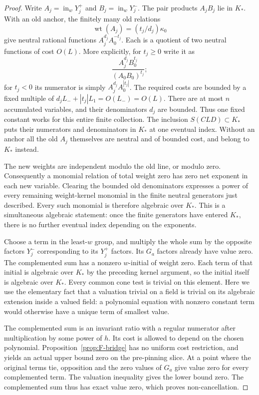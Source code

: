\begin{proof}
Write $A_j=\operatorname{in}_wY_j^+$ and
$B_j=\operatorname{in}_wY_j^-$.  The pair products $A_jB_j$ lie in $K_*$.
With an old anchor, the finitely many old relations
\[
 \operatorname{wt}(A_j)=(t_j/d_j)\kappa_0
\]
give neutral rational functions $A_j^{d_j}A_0^{-t_j}$.  Each is a quotient
of two neutral functions of cost $O(L)$.  More explicitly, for $t_j\ge0$
write it as
\[
 \frac{A_j^{d_j}B_0^{t_j}}{(A_0B_0)^{t_j}};
\]
for $t_j<0$ its numerator is simply $A_j^{d_j}A_0^{|t_j|}$.  The required
costs are bounded by a fixed multiple of
$d_jL_-+|t_j|L_1=O(L_-)=O(L)$.  There are at most $n$ accumulated
variables, and their denominators $d_j$ are bounded.  Thus one fixed
constant works for this entire finite collection.  The inclusion
$S(CLD)\subset K_*$ puts their numerators and denominators in $K_*$ at
one eventual index.  Without an anchor all the old $A_j$ themselves are
neutral and of bounded cost, and belong to $K_*$ instead.

The new weights are independent modulo the old line, or modulo zero.
Consequently a monomial relation of total weight zero has zero net
exponent in each new variable.  Clearing the bounded old denominators
expresses a power of every remaining weight-kernel monomial in the
finite neutral generators just described.  Every such monomial is
therefore algebraic over $K_*$.  This is a simultaneous algebraic
statement: once the finite generators have entered $K_*$, there is no
further eventual index depending on the exponents.

Choose a term in the least-$w$ group, and multiply the whole sum by the
opposite factors $Y_j^-$ corresponding to its $Y_j^+$ factors.  Its
$G_a$ factors already have value zero.  The complemented sum has a
nonzero $w$-initial of weight zero.  Each term of that initial is
algebraic over $K_*$ by the preceding kernel argument, so the initial
itself is algebraic over $K_*$.  Every common cone test is trivial on
this element.  Here we use the elementary fact that a valuation trivial
on a field is trivial on its algebraic extension inside a valued
field: a polynomial equation with nonzero constant term would otherwise
have a unique term of smallest value.

The complemented sum is an invariant ratio with a regular numerator
after multiplication by some power of $h$.  Its cost is allowed to
depend on the chosen polynomial.  Proposition~\ref{prop:F-bridge} has
no uniform cost restriction, and yields an actual upper bound zero on
the pre-pinning slice.  At a point where the original terms tie,
opposition and the zero values of $G_a$ give value zero for every
complemented term.  The valuation inequality gives the lower bound
zero.  The complemented sum thus has exact value zero, which proves
non-cancellation.


\end{proof}
